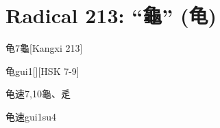 
\section*{Radical 213: ``⿔'' (龟)}

\begin{Entry}{龟}{7}{⿔}[Kangxi 213]
  \begin{Phonetics}{龟}{gui1}[][HSK 7-9]
  \end{Phonetics}
\end{Entry}

\begin{Entry}{龟速}{7,10}{⿔、⾡}
  \begin{Phonetics}{龟速}{gui1su4}
  \end{Phonetics}
\end{Entry}



